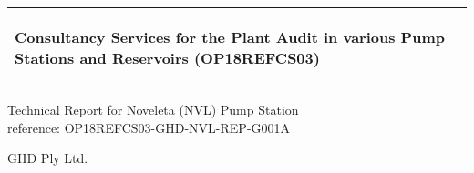 %
\begin{titlepage}
  \addtolength{\hoffset}{0.5\evensidemargin-0.5\oddsidemargin} %
  \noindent%
  \begin{tabular}{@{}p{\textwidth}@{}}
    \toprule[2pt]
    \midrule
    \vspace{0.2cm}
    \begin{center}
    \Huge{\textbf{
      Consultancy Services for the Plant Audit in various Pump Stations and Reservoirs (OP18REFCS03) %
    }}
    \end{center}
    \begin{center}
      \Large{
      }
    \end{center}
    \vspace{0.2cm}\\
    \midrule
    \toprule[2pt]
  \end{tabular}
  \vspace{4 cm}
  \begin{center}
    {\large
      Technical Report for Noveleta (NVL) Pump Station%
    }\\
    \vspace{0.2cm}
    {\Large
      reference: OP18REFCS03-GHD-NVL-REP-G001A%
    }
  \end{center}
  \vfill
  \begin{center}
  GHD Ply Ltd.\\
  \end{center}
\end{titlepage}
\clearpage